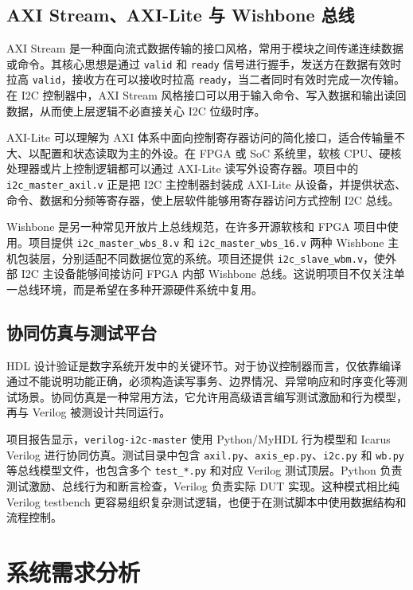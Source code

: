 \documentclass[12pt,a4paper]{article}
\numberwithin{equation}{section}
\begin{document}
\subsection{AXI Stream、AXI-Lite 与 Wishbone 总线}

AXI Stream 是一种面向流式数据传输的接口风格，常用于模块之间传递连续数据或命令。其核心思想是通过 \texttt{valid} 和 \texttt{ready} 信号进行握手，发送方在数据有效时拉高 \texttt{valid}，接收方在可以接收时拉高 \texttt{ready}，当二者同时有效时完成一次传输。在 I2C 控制器中，AXI Stream 风格接口可以用于输入命令、写入数据和输出读回数据，从而使上层逻辑不必直接关心 I2C 位级时序。

AXI-Lite 可以理解为 AXI 体系中面向控制寄存器访问的简化接口，适合传输量不大、以配置和状态读取为主的外设。在 FPGA 或 SoC 系统里，软核 CPU、硬核处理器或片上控制逻辑都可以通过 AXI-Lite 读写外设寄存器。项目中的 \texttt{i2c\_master\_axil.v} 正是把 I2C 主控制器封装成 AXI-Lite 从设备，并提供状态、命令、数据和分频等寄存器，使上层软件能够用寄存器访问方式控制 I2C 总线。

Wishbone 是另一种常见开放片上总线规范，在许多开源软核和 FPGA 项目中使用。项目提供 \texttt{i2c\_master\_wbs\_8.v} 和 \texttt{i2c\_master\_wbs\_16.v} 两种 Wishbone 主机包装层，分别适配不同数据位宽的系统。项目还提供 \texttt{i2c\_slave\_wbm.v}，使外部 I2C 主设备能够间接访问 FPGA 内部 Wishbone 总线。这说明项目不仅关注单一总线环境，而是希望在多种开源硬件系统中复用。

\subsection{协同仿真与测试平台}

HDL 设计验证是数字系统开发中的关键环节。对于协议控制器而言，仅依靠编译通过不能说明功能正确，必须构造读写事务、边界情况、异常响应和时序变化等测试场景。协同仿真是一种常用方法，它允许用高级语言编写测试激励和行为模型，再与 Verilog 被测设计共同运行。

项目报告显示，\texttt{verilog-i2c-master} 使用 Python/MyHDL 行为模型和 Icarus Verilog 进行协同仿真。测试目录中包含 \texttt{axil.py}、\texttt{axis\_ep.py}、\texttt{i2c.py} 和 \texttt{wb.py} 等总线模型文件，也包含多个 \texttt{test\_*.py} 和对应 Verilog 测试顶层。Python 负责测试激励、总线行为和断言检查，Verilog 负责实际 DUT 实现。这种模式相比纯 Verilog testbench 更容易组织复杂测试逻辑，也便于在测试脚本中使用数据结构和流程控制。

\clearpage
\section{系统需求分析}
\end{document}
